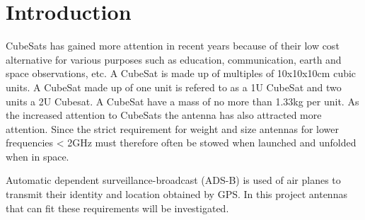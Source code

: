 \chapter{Introduction}\label{ch:introduction}

CubeSats has gained more attention in recent years because of their low cost alternative for various purposes such
as education, communication, earth and space observations, etc. A CubeSat is made up of multiples of 10x10x10cm cubic units. A CubeSat made up of one unit is refered to as a 1U CubeSat and two units a 2U Cubesat. A CubeSat have a mass of no more than 1.33kg per unit. \citep{CalPol13} As the increased attention to CubeSats the antenna has also attracted more attention. Since the strict requirement for weight and size antennas for lower frequencies < 2GHz must therefore often be stowed when launched and unfolded when in space.     

Automatic dependent surveillance-broadcast (ADS-B) is used of air planes to transmit their identity and location obtained by GPS. In this project antennas that can fit these requirements will be investigated.   


